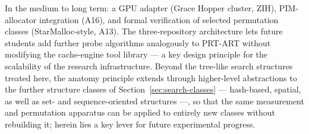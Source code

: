 \medskip
In the medium to long term: a GPU adapter (Grace Hopper cluster, ZIH), PIM-allocator integration
(A16), and formal verification of selected permutation classes (StarMalloc-style, A13). The
three-repository architecture lets future students add further probe algorithms analogously to
PRT-ART without modifying the cache-engine tool library --- a key design principle for the
scalability of the research infrastructure. Beyond the tree-like search structures treated here, the
anatomy principle extends through higher-level abstractions to the further structure classes of
Section~\ref{sec:search-classes} --- hash-based, spatial, as well as set- and sequence-oriented
structures ---, so that the same measurement and permutation apparatus can be applied to entirely
new classes without rebuilding it; herein lies a key lever for future experimental progress.
